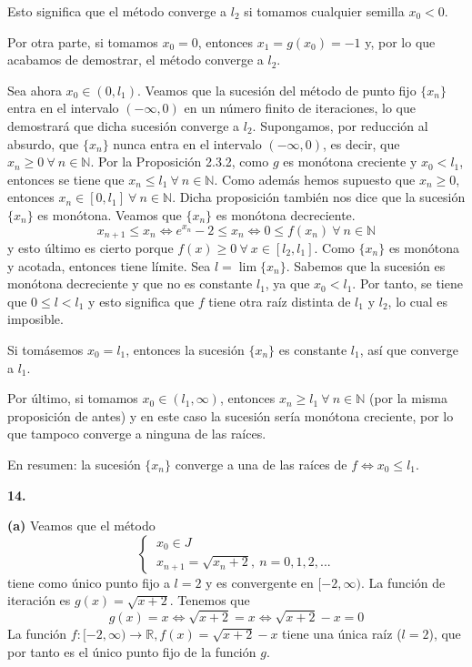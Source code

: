 \documentclass[12pt]{report}
\newcommand{\R}{\mathbb R}
\newcommand{\N}{\mathbb N}
\begin{document}
Esto significa que el método converge a $l_2$ si tomamos cualquier semilla $x_0 < 0$. 

\vspace{2mm}
Por otra parte, si tomamos $x_0 = 0$, entonces $x_1 = g(x_0) = -1$ y, por lo que acabamos de demostrar, el método converge a $l_2$.

\vspace{2mm}
Sea ahora $x_0 \in (0,l_1)$. Veamos que la sucesión del método de punto fijo $\{x_n\}$ entra en el intervalo $(-\infty,0)$ en un número finito de iteraciones, lo que demostrará que dicha sucesión converge a $l_2$. Supongamos, por reducción al absurdo, que $\{x_n\}$ nunca entra en el intervalo $(-\infty,0)$, es decir, que $x_n \geq 0 \ \forall \ n \in \N$. Por la Proposición 2.3.2, como $g$ es monótona creciente y $x_0 < l_1$, entonces se tiene que $x_n \leq l_1 \ \forall \ n \in \N$. Como además hemos supuesto que $x_n \geq 0$, entonces $x_n \in [0,l_1] \ \forall \ n \in \N$. Dicha proposición también nos dice que la sucesión $\{x_n\}$ es monótona. Veamos que $\{x_n\}$ es monótona decreciente.
\[x_{n+1} \leq x_n \iff e^{x_n}-2 \leq x_n \iff 0 \leq f(x_n) \ \forall \ n \in \N\]
y esto último es cierto porque $f(x) \geq 0 \ \forall \ x \in [l_2,l_1]$. Como $\{x_n\}$ es monótona y acotada, entonces tiene límite. Sea $l = \lim \{x_n\}$. Sabemos que la sucesión es monótona decreciente y que no es constante $l_1$, ya que $x_0 < l_1$. Por tanto, se tiene que $0 \leq l < l_1$ y esto significa que $f$ tiene otra raíz distinta de $l_1$ y $l_2$, lo cual es imposible.

\vspace{2mm}
Si tomásemos $x_0 = l_1$, entonces la sucesión $\{x_n\}$ es constante $l_1$, así que converge a $l_1$.

\vspace{2mm}
Por último, si tomamos $x_0 \in (l_1, \infty)$, entonces $x_n \geq l_1 \ \forall \ n \in \N$ (por la misma proposición de antes) y en este caso la sucesión sería monótona creciente, por lo que tampoco converge a ninguna de las raíces.

\vspace{2mm}
En resumen: la sucesión $\{x_n\}$ converge a una de las raíces de $f \iff x_0 \leq l_1$. 

\vspace{6mm}
\textbf{14. }

\vspace{2mm}
\textbf{(a) } Veamos que el método
\[
\begin{cases}
    \ x_0 \in J \\
    \ x_{n+1} = \sqrt{x_n+2}, \ n = 0,1,2,...
\end{cases}
\]
tiene como único punto fijo a $l = 2$ y es convergente en $[-2,\infty)$. La función de iteración es $g(x) = \sqrt{x+2}$. Tenemos que
\[g(x) = x \iff \sqrt{x+2} = x \iff \sqrt{x+2} - x = 0\]
La función $f \colon [-2,\infty) \to \R, f(x) = \sqrt{x+2}-x$ tiene una única raíz ($l = 2$), que por tanto es el único punto fijo de la función $g$.
\end{document}
